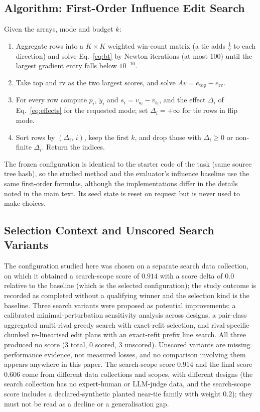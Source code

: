 \documentclass{article}
\begin{document}
\subsection{Algorithm: First-Order Influence Edit Search}
\label{app:algo}
Given the arrays, mode and budget $k$:
\begin{enumerate}
\item Aggregate rows into a $K\times K$ weighted win-count matrix (a tie adds $\tfrac12$ to each direction) and solve Eq.~\eqref{eq:bt} by Newton iterations (at most 100) until the largest gradient entry falls below $10^{-10}$.
\item Take $\mathrm{top}$ and $\mathrm{rv}$ as the two largest scores, and solve $A v=e_{\mathrm{top}}-e_{\mathrm{rv}}$.
\item For every row compute $p_i$, $\tilde y_i$ and $s_i=v_{a_i}-v_{b_i}$, and the effect $\Delta_i$ of Eq.~\eqref{eq:effects} for the requested mode; set $\Delta_i=+\infty$ for tie rows in flip mode.
\item Sort rows by $(\Delta_i,\,i)$, keep the first $k$, and drop those with $\Delta_i\ge0$ or non-finite $\Delta_i$. Return the indices.
\end{enumerate}
The frozen configuration is identical to the starter code of the task (same source tree hash), so the studied method and the evaluator's influence baseline use the same first-order formulas, although the implementations differ in the details noted in the main text. %
Its seed state is reset on request but is never used to make choices.

\subsection{Selection Context and Unscored Search Variants}
\label{app:selection}
The configuration studied here was chosen on a separate search data collection, on which it obtained a search-scope score of $0.914$ with a score delta of $0.0$ relative to the baseline (which is the selected configuration); the study outcome is recorded as completed without a qualifying winner and the selection kind is the baseline. %
Three search variants were proposed as potential improvements: a calibrated minimal-perturbation sensitivity analysis across designs, a pair-class aggregated multi-rival greedy search with exact-refit selection, and rival-specific chunked re-linearised edit plans with an exact-refit prefix line search. All three produced no score ($3$ total, $0$ scored, $3$ unscored). %
Unscored variants are missing performance evidence, not measured losses, and no comparison involving them appears anywhere in this paper. The search-scope score $0.914$ and the final score $0.606$ come from different data collections and scopes, with different designs (the search collection has no expert-human or LLM-judge data, and the search-scope score includes a declared-synthetic planted near-tie family with weight $0.2$); they must not be read as a decline or a generalisation gap.
\end{document}
